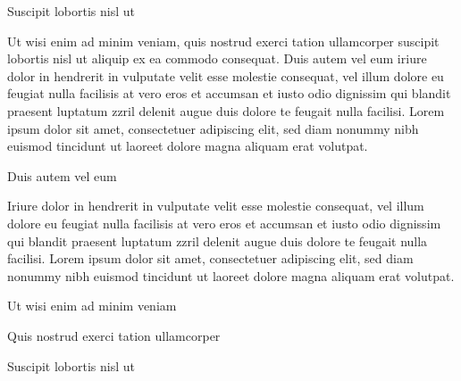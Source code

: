 \documentclass[11pt,twoside]{article}\makeatletter
\begin{document}
Suscipit lobortis nisl ut \par
Ut wisi enim ad minim veniam, quis nostrud exerci tation ullamcorper suscipit lobortis nisl ut aliquip ex ea commodo consequat. Duis autem vel eum iriure dolor in hendrerit in vulputate velit esse molestie consequat, vel illum dolore eu feugiat nulla facilisis at vero eros et accumsan et iusto odio dignissim qui blandit praesent luptatum zzril delenit augue duis dolore te feugait nulla facilisi. Lorem ipsum dolor sit amet, consectetuer adipiscing elit, sed diam nonummy nibh euismod tincidunt ut laoreet dolore magna aliquam erat volutpat. \par
Duis autem vel eum \par
Iriure dolor in hendrerit in vulputate velit esse molestie consequat, vel illum dolore eu feugiat nulla facilisis at vero eros et accumsan et iusto odio dignissim qui blandit praesent luptatum zzril delenit augue duis dolore te feugait nulla facilisi. Lorem ipsum dolor sit amet, consectetuer adipiscing elit, sed diam nonummy nibh euismod tincidunt ut laoreet dolore magna aliquam erat volutpat. \par
Ut wisi enim ad minim veniam\par
Quis nostrud exerci tation ullamcorper \par
Suscipit lobortis nisl ut 
\end{document}
